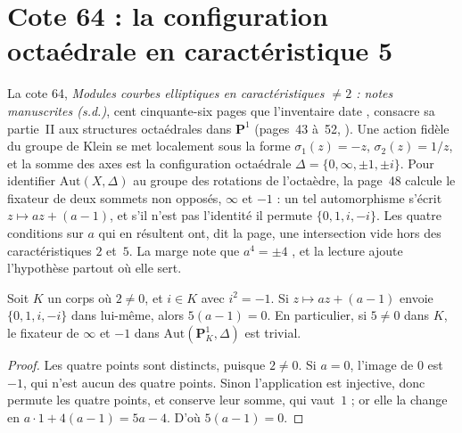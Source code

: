 \section[Cote 64 : la configuration octaédrale en caractéristique 5]{Cote 64 : la configuration octaédrale en caractéristique 5\protect{}}\label{sec:64}

La cote 64, \emph{Modules courbes elliptiques en caractéristiques $\neq 2$ : notes manuscrites (s.d.)}, cent cinquante-six pages que l'inventaire date \q{[à partir de 1980-1982]}, consacre sa partie~II aux structures octaédrales dans $\mathbf P^1$ (pages~43 à~52, ). Une action fidèle du groupe de Klein se met localement sous la forme $\sigma_1(z) = -z$, $\sigma_2(z) = 1/z$, et la somme des axes est la configuration octaédrale $\Delta = \{0, \infty, \pm 1, \pm i\}$. Pour identifier $\mathrm{Aut}(X, \Delta)$ au groupe des rotations de l'octaèdre, la page~48 calcule le fixateur de deux sommets non opposés, $\infty$ et $-1$ : un tel automorphisme s'écrit $z \mapsto az + (a - 1)$, et s'il n'est pas l'identité il permute $\{0, 1, i, -i\}$. Les quatre conditions sur $a$ qui en résultent ont, dit la page, une intersection vide hors des caractéristiques $2$ et~$5$. La marge note que $a^4 = \pm 4$ , et la lecture ajoute l'hypothèse  partout où elle sert.

\begin{encadre}
\begin{theoreme}\label{thm:64-fixateur}
Soit $K$ un corps où $2 \neq 0$, et $i \in K$ avec $i^2 = -1$. Si $z \mapsto az + (a - 1)$ envoie $\{0, 1, i, -i\}$ dans lui-même, alors $5(a - 1) = 0$. En particulier, si $5 \neq 0$ dans $K$, le fixateur de $\infty$ et $-1$ dans $\mathrm{Aut}(\mathbf P^1_K, \Delta)$ est trivial.
\end{theoreme}
\end{encadre}

\begin{proof}
Les quatre points sont distincts, puisque $2 \neq 0$. Si $a = 0$, l'image de $0$ est $-1$, qui n'est aucun des quatre points. Sinon l'application est injective, donc permute les quatre points, et conserve leur somme, qui vaut~$1$ ; or elle la change en $a \cdot 1 + 4(a - 1) = 5a - 4$. D'où $5(a - 1) = 0$.
\end{proof}

